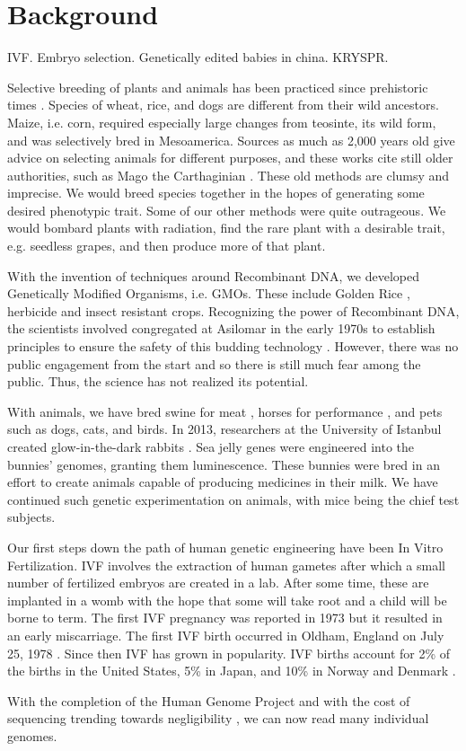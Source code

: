 \section{Background}
\label{sec:background}

IVF. Embryo selection.
Genetically edited babies in china.
KRYSPR.

Selective breeding of plants and animals has been practiced since prehistoric times \cite{Buffum1909}.
Species of wheat, rice, and dogs are different from their wild ancestors.
Maize, i.e. corn, required especially large changes from teosinte, its wild form, and was selectively bred in Mesoamerica.
Sources as much as 2,000 years old give advice on selecting animals for different purposes, and these works cite still older authorities, such as Mago the Carthaginian \cite{Lush2017}.
These old methods are clumsy and imprecise.
We would breed species together in the hopes of generating some desired phenotypic trait.
Some of our other methods were quite outrageous.
We would bombard plants with radiation, find the rare plant with a desirable trait, e.g. seedless grapes, and then produce more of that plant.

With the invention of techniques around Recombinant DNA, we developed Genetically Modified Organisms, i.e. GMOs.
These include Golden Rice \cite{Xudong2000}, herbicide \cite{Funke2006} and insect \cite{Paine2005} resistant crops.
Recognizing the power of Recombinant DNA, the scientists involved congregated at Asilomar in the early 1970s to establish principles to ensure the safety of this budding technology \cite{Berg1975}.
However, there was no public engagement from the start and so there is still much fear among the public.
Thus, the science has not realized its potential.

With animals, we have bred swine for meat \cite{OSU2011}, horses for performance \cite{Evans2000}, and pets such as dogs, cats, and birds.
In 2013, researchers at the University of Istanbul created glow-in-the-dark rabbits \cite{Rojhan2013}.
Sea jelly genes were engineered into the bunnies' genomes, granting them luminescence.
These bunnies were bred in an effort to create animals capable of producing medicines in their milk.
We have continued such genetic experimentation on animals, with mice being the chief test subjects.

Our first steps down the path of human genetic engineering have been In Vitro Fertilization.
IVF involves the extraction of human gametes after which a small number of fertilized embryos are created in a lab.
After some time, these are implanted in a womb with the hope that some will take root and a child will be borne to term.
The first IVF pregnancy was reported in 1973 \cite{Kretzer1973} but it resulted in an early miscarriage.
The first IVF birth occurred in Oldham, England on July 25, 1978 \cite{Steptoe1978}.
Since then IVF has grown in popularity.
IVF births account for 2\% of the births in the United States, 5\% in Japan, and 10\% in Norway and Denmark \cite{Metzl2019}.

With the completion of the Human Genome Project and with the cost of sequencing trending towards negligibility \cite{Wetterstrand2019}, we can now read many individual genomes.
